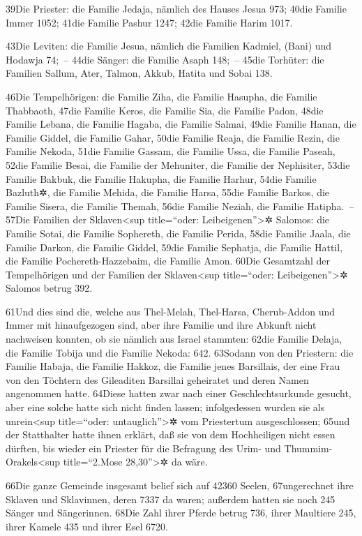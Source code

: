 39Die Priester: die Familie Jedaja, nämlich des Hauses Jesua 973; 40die
Familie Immer 1052; 41die Familie Pashur 1247; 42die Familie Harim 1017.

43Die Leviten: die Familie Jesua, nämlich die Familien Kadmiel, (Bani)
und Hodawja 74;~-- 44die Sänger: die Familie Asaph 148;~-- 45die
Torhüter: die Familien Sallum, Ater, Talmon, Akkub, Hatita und Sobai
138.

46Die Tempelhörigen: die Familie Ziha, die Familie Hasupha, die Familie
Thabbaoth, 47die Familie Keros, die Familie Sia, die Familie Padon,
48die Familie Lebana, die Familie Hagaba, die Familie Salmai, 49die
Familie Hanan, die Familie Giddel, die Familie Gahar, 50die Familie
Reaja, die Familie Rezin, die Familie Nekoda, 51die Familie Gassam, die
Familie Ussa, die Familie Paseah, 52die Familie Besai, die Familie der
Mehuniter, die Familie der Nephisiter, 53die Familie Bakbuk, die Familie
Hakupha, die Familie Harhur, 54die Familie Bazluth✲, die Familie Mehida,
die Familie Harsa, 55die Familie Barkos, die Familie Sisera, die Familie
Themah, 56die Familie Neziah, die Familie Hatipha.~-- 57Die Familien der
Sklaven\textless sup title=``oder: Leibeigenen''\textgreater✲ Salomos:
die Familie Sotai, die Familie Sophereth, die Familie Perida, 58die
Familie Jaala, die Familie Darkon, die Familie Giddel, 59die Familie
Sephatja, die Familie Hattil, die Familie Pochereth-Hazzebaim, die
Familie Amon. 60Die Gesamtzahl der Tempelhörigen und der Familien der
Sklaven\textless sup title=``oder: Leibeigenen''\textgreater✲ Salomos
betrug 392.

61Und dies sind die, welche aus Thel-Melah, Thel-Harsa, Cherub-Addon und
Immer mit hinaufgezogen sind, aber ihre Familie und ihre Abkunft nicht
nachweisen konnten, ob sie nämlich aus Israel stammten: 62die Familie
Delaja, die Familie Tobija und die Familie Nekoda: 642. 63Sodann von den
Priestern: die Familie Habaja, die Familie Hakkoz, die Familie jenes
Barsillais, der eine Frau von den Töchtern des Gileaditen Barsillai
geheiratet und deren Namen angenommen hatte. 64Diese hatten zwar nach
einer Geschlechtsurkunde gesucht, aber eine solche hatte sich nicht
finden lassen; infolgedessen wurden sie als unrein\textless sup
title=``oder: untauglich''\textgreater✲ vom Priestertum ausgeschlossen;
65und der Statthalter hatte ihnen erklärt, daß sie von dem Hochheiligen
nicht essen dürften, bis wieder ein Priester für die Befragung des Urim-
und Thummim-Orakels\textless sup title=``2.Mose 28,30''\textgreater✲ da
wäre.

66Die ganze Gemeinde insgesamt belief sich auf 42360 Seelen,
67ungerechnet ihre Sklaven und Sklavinnen, deren 7337 da waren; außerdem
hatten sie noch 245 Sänger und Sängerinnen. 68Die Zahl ihrer Pferde
betrug 736, ihrer Maultiere 245, ihrer Kamele 435 und ihrer Esel 6720.

